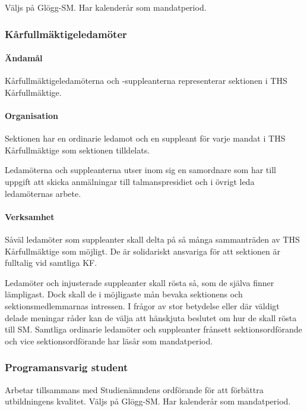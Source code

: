 \documentclass{dgovdoc}
\begin{document}
Väljs på Glögg-SM. Har kalenderår som mandatperiod.

\subsubsection{Kårfullmäktigeledamöter}

\paragraph{Ändamål}

Kårfullmäktigeledamöterna och -suppleanterna representerar sektionen i THS
Kårfullmäktige.

\paragraph{Organisation}

Sektionen har en ordinarie ledamot och en suppleant för varje mandat i THS
Kårfullmäktige som sektionen tilldelats.

Ledamöterna och suppleanterna utser inom sig en samordnare som har till uppgift
att skicka anmälningar till talmanspresidiet och i övrigt leda ledamöternas
arbete.

\paragraph{Verksamhet}

Såväl ledamöter som suppleanter skall delta på så många sammanträden av THS
Kårfullmäktige som möjligt. De är solidariskt ansvariga för att sektionen är
fulltalig vid samtliga KF.

Ledamöter och injusterade suppleanter skall rösta så, som de själva finner
lämpligast. Dock skall de i möjligaste mån bevaka sektionens och
sektionsmedlemmarnas intressen. I frågor av stor betydelse eller där väldigt
delade meningar råder kan de välja att hänskjuta beslutet om hur de skall rösta
till SM. Samtliga ordinarie ledamöter och suppleanter frånsett
sektionsordförande och vice sektionsordförande har läsår som mandatperiod.

\subsubsection{Programansvarig student}

Arbetar tillsammans med Studienämndens ordförande för att förbättra
utbildningens kvalitet. Väljs på Glögg-SM. Har kalenderår som mandatperiod.
\end{document}
